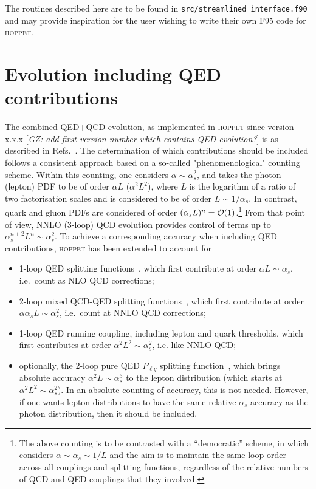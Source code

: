 \documentclass[12pt]{article}
\newcommand{\as}{\alpha_s}
\newcommand{\commentgz}[1]{{\color{red} [\it GZ:  #1}]}
\newcommand{\hoppet}{\textsc{hoppet}\xspace}
\newcommand{\ttt}[1]{\texttt{#1}}
\begin{document}
The routines described here 
are to be 
found in \ttt{src/streamlined\_interface.f90} and may provide inspiration
for the user wishing to write their own F95 code for \hoppet.

\section{Evolution including QED contributions}
\label{sec:qed-evolution}

The combined QED+QCD evolution, as implemented in \hoppet since
version x.x.x\commentgz{add first version number which contains QED
  evolution?} is as described in
Refs.~\cite{Manohar:2016nzj,Manohar:2017eqh,Buonocore:2020nai,Buonocore:2021bsf}.
%
The determination of which contributions should be included follows a
consistent approach based on a so-called "phenomenological" counting
scheme.
%
Within this counting, one considers $\alpha\sim \as^2$, and takes the
photon (lepton) PDF to be of order $\alpha L$ ($\alpha^2 L^2$), where
$L$ is the logarithm of a ratio of two factorisation scales and is
considered to be of order $L \sim 1/\as$. In contrast, quark and gluon
PDFs are considered of order $(\as L)^n={\cal O}(1)$.\footnote{The
  above counting is to be contrasted with a ``democratic'' scheme, in
  which considers $\alpha \sim \as \sim 1/L$ and the aim is to maintain
  the same loop order across all couplings and splitting functions,
  regardless of the relative numbers of QCD and QED couplings that
  they involved.}
%
From that point of view, NNLO (3-loop) QCD evolution provides control of
terms up to $\as^{n+2} L^n \sim \as^2$.
%
To achieve a corresponding accuracy when including QED contributions,
\hoppet has been extended to account for
\begin{itemize}
\item 1-loop QED splitting functions~\cite{Roth:2004ti}, which first
  contribute at order $\alpha L \sim \as$, i.e.\ count as NLO QCD
  corrections;
  
\item 2-loop mixed QCD-QED splitting
  functions~\cite{deFlorian:2016gvk},
  which first contribute at order
  $\alpha \as L \sim \as^2$, i.e.\ count at NNLO QCD corrections;

\item 1-loop QED running coupling, including lepton and quark
  thresholds, which first contributes at order $\alpha^2 L^2 \sim
  \as^2$, i.e. like NNLO QCD; 
  
\item optionally, the 2-loop pure QED $P_{\ell q}$ splitting
  function~\cite{deFlorian:2016gvk}, which brings absolute accuracy
  $\alpha^2 L\sim \as^3$ to the lepton distribution (which starts at
  $\alpha^2 L^2 \sim \as^2$).
  In an absolute counting of accuracy, this is not needed.
  However, if one wants lepton distributions to have the same relative
  $\as$ accuracy as the photon distribution, then it should be
  included.
\end{itemize}
\end{document}
